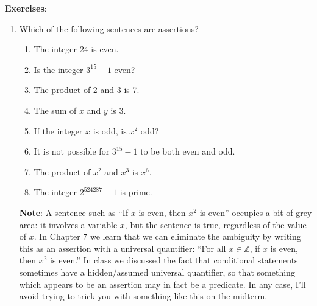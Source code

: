 \documentclass[letterpaper,12pt]{article}
\newcommand{\Z}{\mathbb{Z}}
\begin{document}
{\bf Exercises}:
\begin{enumerate}
 \item Which of the following sentences are assertions?
\begin{enumerate}
 \item The integer 24 is even.
 \item Is the integer $3^{15}-1$ even?
 \item The product of 2 and 3 is 7.
 \item The sum of $x$ and $y$ is 3.
 \item If the integer $x$ is odd, is $x^2$ odd?
 \item It is not possible for $3^{15}-1$ to be both even and odd.
 \item The product of $x^2$ and $x^3$ is $x^6$.
 \item The integer $2^{524287}-1$ is prime.
\end{enumerate}
{\bf Note}: A sentence such as ``If $x$ is even, then $x^2$ is even'' occupies a bit of grey area: it involves a variable $x$, but the sentence is true, regardless of the value of $x$. In Chapter 7 we learn that we can eliminate the ambiguity by writing this as an assertion with a universal quantifier: ``For all $x\in\Z$, if $x$ is even, then $x^2$ is even.'' In class we discussed the fact that conditional statements sometimes have a hidden/assumed universal quantifier, so that something which appears to be an assertion may in fact be a predicate. In any case, I'll avoid trying to trick you with something like this on the midterm.
\end{enumerate}
\end{document}
